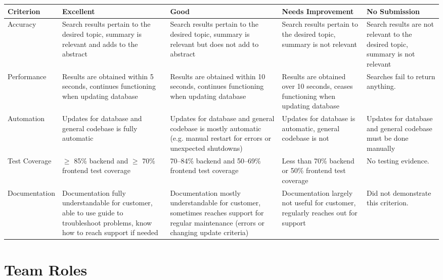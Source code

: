 \documentclass{article}
\begin{document}
\begin{tabularx}{\textwidth}{|X|X|X|X|X|}
    \hline
    \textbf{Criterion} & \textbf{Excellent} & \textbf{Good} & \textbf{Needs Improvement} & \textbf{No Submission}\\
    \hline
    Accuracy & Search results pertain to the desired topic, summary is relevant and adds to the abstract & Search results pertain to the desired topic, summary is relevant but does not add to abstract & Search results pertain to the desired topic, summary is not relevant & Search results are not relevant to the desired topic, summary is not relevant\\
    \hline     
    Performance & Results are obtained within 5 seconds, continues functioning when updating database & Results are obtained within 10 seconds, continues functioning when updating database & Results are obtained over 10 seconds, ceases functioning when updating database & Searches fail to return anything. \\
    \hline
    Automation & Updates for database and general codebase is fully automatic & Updates for database and general codebase is mostly automatic (e.g. manual restart for errors or unexpected shutdowns) & Updates for database is automatic, general codebase is not & Updates for database and general codebase must be done manually \\
    \hline     
     Test Coverage & $\geq$ 85\% backend and $\geq$ 70\% frontend test coverage & 70--84\% backend and 50--69\% frontend test coverage & Less than 70\% backend or 50\% frontend test coverage & No testing evidence. \\
    \hline
    Documentation & Documentation fully understandable for customer, able to use guide to troubleshoot problems, know how to reach support if needed &  Documentation mostly understandable for customer, sometimes reaches support for regular maintenance (errors or changing update criteria) &  Documentation largely not useful for customer, regularly reaches out for support & Did not demonstrate this criterion. \\
    \hline
    
\end{tabularx}



\section*{Team Roles}
\end{document}
